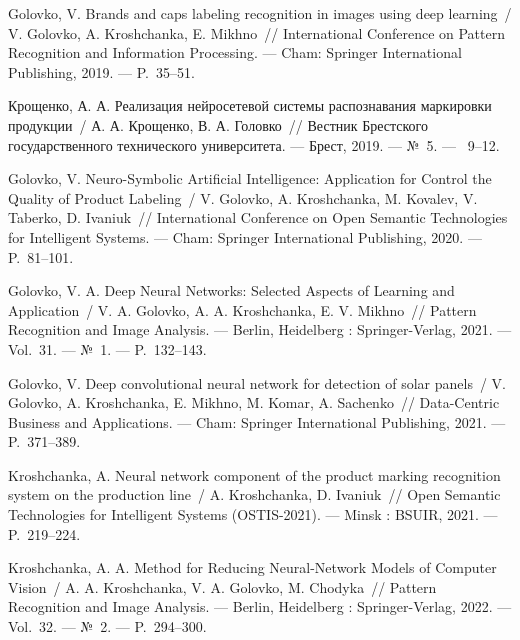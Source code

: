 Golovko, V. Brands and caps labeling recognition in images using deep learning~/ V. Golovko, A. Kroshchanka, E. Mikhno~//
  International Conference on Pattern Recognition and Information Processing. ---
\newblock Cham: Springer International Publishing, 2019. ---
\newblock P.~35--51.

Крощенко, А. А. Реализация нейросетевой системы распознавания маркировки продукции~/ А. А. Крощенко, В. А. Головко~//
  Вестник Брестского государственного технического университета. ---
\newblock Брест, 2019. ---
\newblock №~5. ---
~9--12.

Golovko, V. Neuro-Symbolic Artificial Intelligence: Application for Control the Quality of Product Labeling~/ V. Golovko, A. Kroshchanka, M. Kovalev, V. Taberko, D. Ivaniuk~// 
 International Conference on Open Semantic Technologies for Intelligent Systems. ---
\newblock Cham: Springer International Publishing, 2020. ---
\newblock P.~81--101.

Golovko,  V. A.  Deep Neural Networks: Selected Aspects of Learning and Application~/ V. A. Golovko, A. A. Kroshchanka, E. V. Mikhno~//
  Pattern Recognition and Image Analysis. ---
\newblock Berlin, Heidelberg : Springer-Verlag, 2021. ---
\newblock Vol.~31. ---
\newblock №~1. ---
\newblock P.~132--143.

Golovko, V. Deep convolutional neural network for detection of solar panels~/ V. Golovko, A. Kroshchanka, E. Mikhno, M. Komar, A. Sachenko~//
  Data-Centric Business and Applications. ---
\newblock Cham: Springer International Publishing, 2021. ---
\newblock P.~371--389.

Kroshchanka, A. Neural network component of the product marking recognition system on the production line~/ A. Kroshchanka, D. Ivaniuk~// 
 Open Semantic Technologies for Intelligent Systems (OSTIS-2021). ---
\newblock Minsk : BSUIR, 2021. ---
\newblock P.~219--224.

Kroshchanka, A. A. Method for Reducing Neural-Network Models of Computer Vision~/ A. A. Kroshchanka, V. A. Golovko, M. Chodyka~//
  Pattern Recognition and Image Analysis. ---
\newblock Berlin, Heidelberg : Springer-Verlag, 2022. ---
\newblock Vol.~32. ---
\newblock №~2. ---
\newblock P.~294--300.

